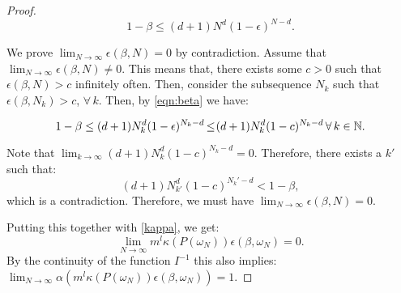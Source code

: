\begin{proof}
\begin{equation}\label{eqn:beta}
1-\beta \leq  (d+1)N^d (1-\epsilon)^{N-d}.
\end{equation}

We prove $\lim_{N \to \infty} \epsilon(\beta, N) = 0$ by contradiction. Assume that $\lim_{N \to \infty} \epsilon(\beta, N) \not= 0$. This means that, there exists some $c > 0$ such that $\epsilon(\beta, N) > c$ infinitely often. Then, consider the subsequence $N_k$ such that $\epsilon(\beta, N_k) > c$, $\forall\, k.$ Then, by \eqref{eqn:beta} we have:

\begin{equation*}
1-\beta\leq  (d+1)N_k^d (1-\epsilon)^{N_k-d}\hspace{-0.4mm} \leq \hspace{-0.7mm}(d+1)N_k^d (1-c)^{N_k-d}\, \forall\,k \in \mathbb{N}. 
\end{equation*}

Note that $\lim_{k \to \infty}(d+1)N_k^d (1-c)^{N_k-d} = 0.$ Therefore, there exists a $k'$ such that:
$$(d+1)N_{k'}^d (1-c)^{N_k'-d} < 1 - \beta,$$ which is a contradiction. Therefore, we must have  $\lim_{N \to \infty} \epsilon (\beta, N) = 0$.

Putting this together with \eqref{kappa}, we get:
$$\lim_{N \to \infty} m^l \kappa(P(\omega_N))\epsilon(\beta, \omega_N) = 0.$$ By the continuity of the function $I^{-1}$ this also implies: $\lim_{N \to \infty} \alpha(m^l \kappa(P(\omega_N)) \epsilon(\beta, \omega_N)) = 1.$


\end{proof}